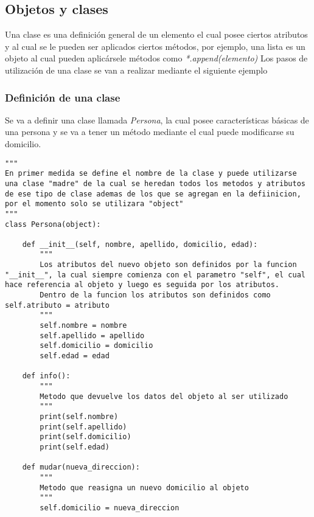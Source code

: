 \documentclass[10pt,a4paper]{article}
\begin{document}
\subsection{Objetos y clases}
Una clase es una definición general de un elemento el cual posee ciertos atributos y al cual se le pueden ser aplicados ciertos métodos, por ejemplo, una lista es un objeto al cual pueden aplicársele métodos como \emph{*.append(elemento)}
Los pasos de utilización de una clase se van a realizar mediante el siguiente ejemplo
\subsubsection{Definición de una clase}
Se va a definir una clase llamada \emph{Persona}, la cual posee características básicas de una persona y se va a tener un método mediante el cual puede modificarse su domicilio.
\begin{lstlisting}[caption={Definición de una clase}]
"""
En primer medida se define el nombre de la clase y puede utilizarse una clase "madre" de la cual se heredan todos los metodos y atributos de ese tipo de clase ademas de los que se agregan en la defiinicion, por el momento solo se utilizara "object"
"""
class Persona(object):
    
    def __init__(self, nombre, apellido, domicilio, edad):  
        """
        Los atributos del nuevo objeto son definidos por la funcion "__init__", la cual siempre comienza con el parametro "self", el cual hace referencia al objeto y luego es seguida por los atributos.
        Dentro de la funcion los atributos son definidos como self.atributo = atributo
        """
        self.nombre = nombre                               
        self.apellido = apellido
        self.domicilio = domicilio
        self.edad = edad
        
    def info():
        """
        Metodo que devuelve los datos del objeto al ser utilizado
        """
        print(self.nombre)
        print(self.apellido)
        print(self.domicilio)
        print(self.edad)
    
    def mudar(nueva_direccion):
        """
        Metodo que reasigna un nuevo domicilio al objeto
        """
        self.domicilio = nueva_direccion
\end{lstlisting}
\newpage
\end{document}
